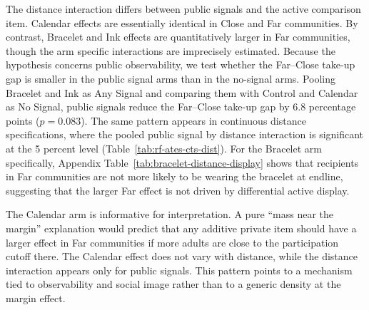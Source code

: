 \documentclass[ECM\space ReStud.tex]{subfiles}
\begin{document}
The distance interaction differs between public signals and the active comparison item. Calendar effects are essentially identical in Close and Far communities. By contrast, Bracelet and Ink effects are quantitatively larger in Far communities, though the arm specific interactions are imprecisely estimated. Because the hypothesis concerns public observability, we test whether the Far--Close take-up gap is smaller in the public signal arms than in the no-signal arms. Pooling Bracelet and Ink as Any Signal and comparing them with Control and Calendar as No Signal, public signals reduce the Far--Close take-up gap by 6.8 percentage points (\(p=0.083\)). The same pattern appears in continuous distance specifications, where the pooled public signal by distance interaction is significant at the 5 percent level (Table~\ref{tab:rf-ates-cts-dist}). For the Bracelet arm specifically, Appendix Table~\ref{tab:bracelet-distance-display} shows that recipients in Far communities are not more likely to be wearing the bracelet at endline, suggesting that the larger Far effect is not driven by differential active display.

The Calendar arm is informative for interpretation. A pure ``mass near the
  margin'' explanation would predict that any additive private item should have a
  larger effect in Far communities if more adults are close to the participation
  cutoff there. The Calendar effect does not vary with distance, while the distance
  interaction appears only for public signals. This pattern points to a mechanism
  tied to observability and social image rather than to a generic density at the
  margin effect.


\end{document}
